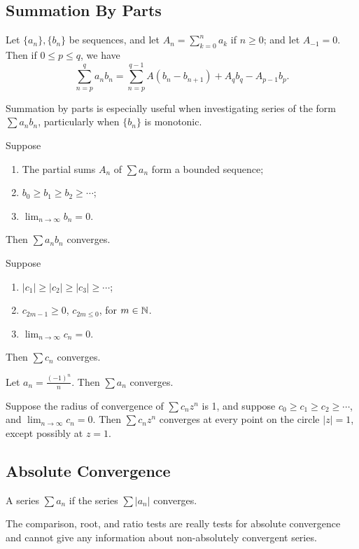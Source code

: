 \documentclass{article}
\begin{document}
\subsection{Summation By Parts}
\begin{theorem}
    Let $\{a_{n}\},\{b_{n}\}$ be sequences, and let $A_{n}=\sum_{k=0}^{n}a_{k}$ if $n\geq 0$; and let $A_{-1}=0$. Then if $0\leq p\leq q$, we have \[\sum_{n=p}^{q}a_{n}b_{n}=\sum_{n=p}^{q-1}A(b_{n}-b_{n+1})+A_{q}b_{q}-A_{p-1}b_{p}.\]
\end{theorem}
\begin{remark}
    Summation by parts is especially useful when investigating series of the form $\sum a_{n}b_{n}$, particularly when $\{b_{n}\}$ is monotonic.
\end{remark}
\begin{theorem}
    Suppose 
    \begin{enumerate}
        \item The partial sums $A_{n}$ of $\sum a_{n}$ form a bounded sequence;
        \item $b_{0}\geq b_{1}\geq b_{2}\geq \dotsi$;
        \item $\lim_{n\rightarrow\infty}b_{n}=0$.
    \end{enumerate}
    Then $\sum a_{n}b_{n}$ converges.
\end{theorem}
\begin{theorem}
    Suppose 
    \begin{enumerate}
        \item $|c_{1}|\geq |c_{2}|\geq |c_{3}|\geq \dotsi$;
        \item $c_{2m-1}\geq 0$, $c_{2m\leq 0}$, for $m\in\mathbb N$.
        \item $\lim_{n\rightarrow\infty}c_{n}=0$.
    \end{enumerate}
    Then $\sum c_{n}$ converges.
\end{theorem}   
\begin{example}
    Let $a_{n}=\frac{(-1)^{n}}{n}$. Then $\sum a_{n}$ converges.
\end{example}
\begin{theorem}
    Suppose the radius of convergence of $\sum c_{n}z^{n}$ is 1, and suppose $c_{0}\geq c_{1}\geq c_{2}\geq \dotsi$, and $\lim_{n\rightarrow\infty}c_{n}=0$. Then $\sum c_{n}z^{n}$ converges at every point on the circle $|z|=1$, except possibly at $z=1$.
\end{theorem}
\subsection{Absolute Convergence}
\begin{definition}
    A series $\sum a_{n}$  if the series $\sum|a_{n}|$ converges.
\end{definition}
\begin{remark}
    The comparison, root, and ratio tests are really tests for absolute convergence and cannot give any information about non-absolutely convergent series.
\end{remark}
\end{document}
